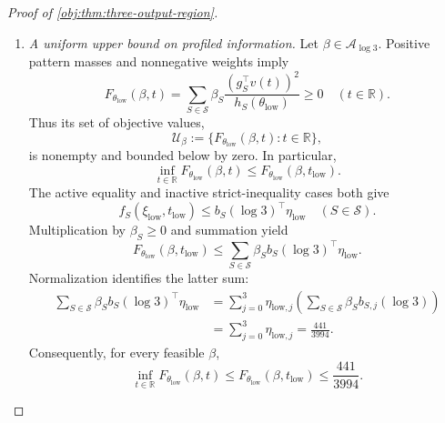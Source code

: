 \begin{proof}[Proof of \cref{obj:thm:three-output-region}]
\begin{enumerate}
\[=f_S(\xi_{\mathrm{low}},t_{\mathrm{low}})
\quad(S\in\mathcal K),
\]
\[
f_S(\xi_{\mathrm{low}},t_{\mathrm{low}})
<
b_S(\log3)^\top\eta_{\mathrm{low}}
\quad(S\notin\mathcal K).
\]
The point \(\xi_{\mathrm{low}}\) belongs to \(\mathcal D\). Together with the feasible positive active weights and stationarity established above, these equalities and strict inequalities supply its certificate in \cref{obj:def:support-regions}. Therefore
\[
\xi_{\mathrm{low}}\in\mathcal R_3.
\]

\item \textit{A uniform upper bound on profiled information.}
Let \(\beta\in\mathcal A_{\log3}\). Positive pattern masses and nonnegative weights imply
\[
F_{\theta_{\mathrm{low}}}(\beta,t)
=
\sum_{S\in\mathcal S}\beta_S
\frac{(g_S^\top v(t))^2}{h_S(\theta_{\mathrm{low}})}
\ge0
\quad(t\in\mathbb R).
\]
Thus its set of objective values,
\[
\mathcal U_\beta:=
\{F_{\theta_{\mathrm{low}}}(\beta,t):t\in\mathbb R\},
\]
is nonempty and bounded below by zero. In particular,
\[
\inf_{t\in\mathbb R}F_{\theta_{\mathrm{low}}}(\beta,t)
\le F_{\theta_{\mathrm{low}}}(\beta,t_{\mathrm{low}}).
\]
The active equality and inactive strict-inequality cases both give
\[
f_S(\xi_{\mathrm{low}},t_{\mathrm{low}})
\le b_S(\log3)^\top\eta_{\mathrm{low}}
\quad(S\in\mathcal S).
\]
Multiplication by \(\beta_S\ge0\) and summation yield
\[
F_{\theta_{\mathrm{low}}}(\beta,t_{\mathrm{low}})
\le
\sum_{S\in\mathcal S}\beta_S b_S(\log3)^\top\eta_{\mathrm{low}}.
\]
Normalization identifies the latter sum:
\[
\begin{aligned}
\sum_{S\in\mathcal S}\beta_S b_S(\log3)^\top\eta_{\mathrm{low}}
&=
\sum_{j=0}^3\eta_{\mathrm{low},j}
\left(\sum_{S\in\mathcal S}\beta_S b_{S,j}(\log3)\right)\\
&=\sum_{j=0}^3\eta_{\mathrm{low},j}
=\frac{441}{3994}.
\end{aligned}
\]
Consequently, for every feasible \(\beta\),
\[
\inf_{t\in\mathbb R}F_{\theta_{\mathrm{low}}}(\beta,t)
\le
F_{\theta_{\mathrm{low}}}(\beta,t_{\mathrm{low}})
\le\frac{441}{3994}.
\]


\end{enumerate}
\end{proof}
